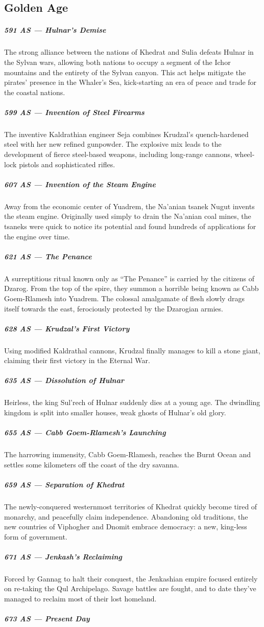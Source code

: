 \subsection*{Golden Age}
\subparagraph{591 AS --- Hulnar's Demise} The strong alliance between the nations of Khedrat and Sulia defeats Hulnar in the Sylvan wars, allowing both nations to occupy a segment of the Ichor mountains and the entirety of the Sylvan canyon.
This act helps mitigate the pirates' presence in the Whaler's Sea, kick-starting an era of peace and trade for the coastal nations.

\subparagraph{599 AS --- Invention of Steel Firearms} The inventive Kaldrathian engineer Seja combines Krudzal's quench-hardened steel with her new refined gunpowder.
The explosive mix leads to the development of fierce steel-based weapons, including long-range cannons, wheel-lock pistols and sophisticated rifles.

\subparagraph{607 AS --- Invention of the Steam Engine} Away from the economic center of Yuadrem, the Na'anian tsanek Nugut invents the steam engine.
Originally used simply to drain the Na'anian coal mines, the tsaneks were quick to notice its potential and found hundreds of applications for the engine over time.

\subparagraph{621 AS --- The Penance} A surreptitious ritual known only as ``The Penance'' is carried by the citizens of Dzarog.
From the top of the spire, they summon a horrible being known as Cabb Goem-Rlamesh into Yuadrem.
The colossal amalgamate of flesh slowly drags itself towards the east, ferociously protected by the Dzarogian armies.

\subparagraph{628 AS --- Krudzal's First Victory} Using modified Kaldrathal cannons, Krudzal finally manages to kill a stone giant, claiming their first victory in the Eternal War.

\subparagraph{635 AS --- Dissolution of Hulnar} Heirless, the king Sul'rech of Hulnar suddenly dies at a young age.
The dwindling kingdom is split into smaller houses, weak ghosts of Hulnar's old glory.

\subparagraph{655 AS --- Cabb Goem-Rlamesh's Launching} The harrowing immensity, Cabb Goem-Rlamesh, reaches the Burnt Ocean and settles some kilometers off the coast of the dry savanna.

\subparagraph{659 AS --- Separation of Khedrat} The newly-conquered westernmost territories of Khedrat quickly become tired of monarchy, and peacefully claim independence.
Abandoning old traditions, the new countries of Viphogher and Dnomit embrace democracy: a new, king-less form of government.

\subparagraph{671 AS --- Jenkash's Reclaiming} Forced by Gannag to halt their conquest, the Jenkashian empire focused entirely on re-taking the Qul Archipelago.
Savage battles are fought, and to date they've managed to reclaim most of their lost homeland.

\subparagraph{673 AS --- Present Day}

\newpage
